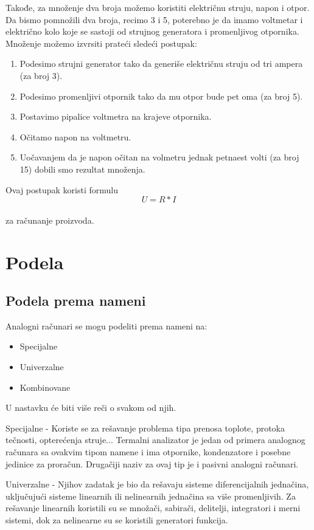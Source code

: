 \documentclass[a4paper]{article}
\begin{document}
    Takođe, za množenje dva broja možemo koristiti električnu struju, napon i otpor.\\
    Da bismo pomnožili dva broja, recimo 3 i 5, poterebno je da imamo voltmetar i električno kolo koje se sastoji od strujnog generatora i promenljivog otpornika. Množenje možemo izvrsiti prateći sledeći postupak:\begin{enumerate}
        \item Podesimo strujni generator tako da generiše električnu struju od tri ampera (za broj 3).
        \item Podesimo promenljivi otpornik tako da mu otpor bude pet oma (za broj 5).
        \item Postavimo pipalice voltmetra na krajeve otpornika.
        \item Očitamo napon na voltmetru.
        \item Uočavanjem da je napon očitan na volmetru jednak petnaest volti (za broj 15) dobili smo rezultat množenja.
    \end{enumerate}
    \begin{center}
    	Ovaj postupak koristi formulu
    	$$ U = R*I $$\\
    	za računanje proizvoda.
\end{center}

\section{Podela}
\label{sec:naslovcic}
\subsection{Podela prema nameni}
Analogni računari se mogu podeliti prema nameni na:
	\begin{itemize}
		\item Specijalne
		\item Univerzalne
		\item Kombinovane
	\end{itemize}
U nastavku će biti više reči o svakom od njih.

Specijalne - Koriste se za rešavanje problema tipa prenosa toplote, protoka tečnosti, opterećenja struje... Termalni analizator je jedan od primera analognog računara sa ovakvim tipom namene i ima otpornike, kondenzatore i posebne jedinice za proračun. Drugačiji naziv za ovaj tip je i pasivni analogni računari.


Univerzalne - Njihov zadatak je bio da rešavaju sisteme diferencijalnih jednačina, uključujući sisteme linearnih ili nelinearnih jednačina sa više promenljivih. Za rešavanje linearnih koristili su se množači, sabirači, delitelji, integratori i merni sistemi, dok za nelinearne su se koristili generatori funkcija.
\end{document}
